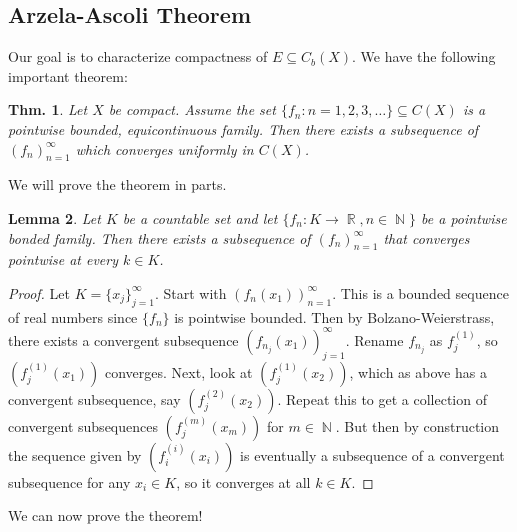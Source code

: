 \documentclass[12pt, a4paper]{book}
\DeclareMathOperator{\N}{\mathbb{N}}
\DeclareMathOperator{\R}{\mathbb{R}}
\newtheorem{theorem}{Thm.}[section]
\newtheorem{lemma}[theorem]{Lemma}
\theoremstyle{nonumberplain}
\newtheorem{proof}{Proof}
\begin{document}
\subsection{Arzela-Ascoli Theorem}
Our goal is to characterize compactness of $E\subseteq C_b(X)$.
We have the following important theorem:
\begin{theorem}
    Let $X$ be compact.
    Assume the set $\{f_n:n=1,2,3,\ldots\}\subseteq C(X)$ is a pointwise bounded, equicontinuous family.
    Then there exists a subsequence of $(f_n)_{n=1}^\infty$ which converges uniformly in $C(X)$.
\end{theorem}
We will prove the theorem in parts.
\begin{lemma}
    Let $K$ be a countable set and let $\{f_n:K\to\R,n\in\N\}$ be a pointwise bonded family.
    Then there exists a subsequence of $(f_n)_{n=1}^\infty$ that converges pointwise at every $k\in K$.
\end{lemma}
\begin{proof}
    Let $K=\{x_j\}_{j=1}^\infty$.
    Start with $(f_n(x_1))_{n=1}^\infty$.
    This is a bounded sequence of real numbers since $\{f_n\}$ is pointwise bounded.
    Then by Bolzano-Weierstrass, there exists a convergent subsequence $(f_{n_j}(x_1))_{j=1}^\infty$.
    Rename $f_{n_j}$ as $f_j^{(1)}$, so $(f_j^{(1)}(x_1))$ converges.
    Next, look at $(f_j^{(1)}(x_2))$, which as above has a convergent subsequence, say $(f_j^{(2)}(x_2))$.
    Repeat this to get a collection of convergent subsequences $(f_j^{(m)}(x_m))$ for $m\in\N$.
    But then by construction the sequence given by $(f_i^{(i)}(x_i))$ is eventually a subsequence of a convergent subsequence for any $x_i\in K$, so it converges at all $k\in K$.
\end{proof}
We can now prove the theorem!
\end{document}
